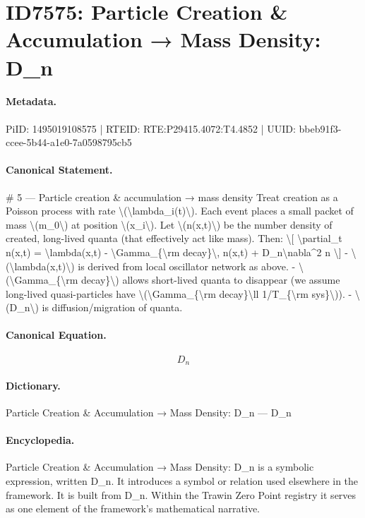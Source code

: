\section*{ID7575: Particle Creation \& Accumulation → Mass Density: D\_n}
\paragraph{Metadata.}
PiID: 1495019108575 | RTEID: RTE:P29415.4072:T4.4852 | UUID: bbeb91f3-ccee-5b44-a1e0-7a0598795cb5

\paragraph{Canonical Statement.}
\# 5 — Particle creation \& accumulation → mass density Treat creation as a Poisson process with rate \textbackslash{}(\textbackslash{}lambda\_i(t)\textbackslash{}). Each event places a small packet of mass \textbackslash{}(m\_0\textbackslash{}) at position \textbackslash{}(x\_i\textbackslash{}). Let \textbackslash{}(n(x,t)\textbackslash{}) be the number density of created, long-lived quanta (that effectively act like mass). Then: \textbackslash{}[ \textbackslash{}partial\_t n(x,t) = \textbackslash{}lambda(x,t) - \textbackslash{}Gamma\_\{\textbackslash{}rm decay\}\textbackslash{}, n(x,t) + D\_n\textbackslash{}nabla\textasciicircum{}2 n \textbackslash{}] - \textbackslash{}(\textbackslash{}lambda(x,t)\textbackslash{}) is derived from local oscillator network as above. - \textbackslash{}(\textbackslash{}Gamma\_\{\textbackslash{}rm decay\}\textbackslash{}) allows short-lived quanta to disappear (we assume long-lived quasi-particles have \textbackslash{}(\textbackslash{}Gamma\_\{\textbackslash{}rm decay\}\textbackslash{}ll 1/T\_\{\textbackslash{}rm sys\}\textbackslash{})). - \textbackslash{}(D\_n\textbackslash{}) is diffusion/migration of quanta.

\paragraph{Canonical Equation.}
\[
D_n
\]

\paragraph{Dictionary.}
Particle Creation \& Accumulation → Mass Density: D\_n — D\_n

\paragraph{Encyclopedia.}
Particle Creation \& Accumulation → Mass Density: D\_n is a symbolic expression, written D\_n. It introduces a symbol or relation used elsewhere in the framework. It is built from D\_n. Within the Trawin Zero Point registry it serves as one element of the framework's mathematical narrative.
